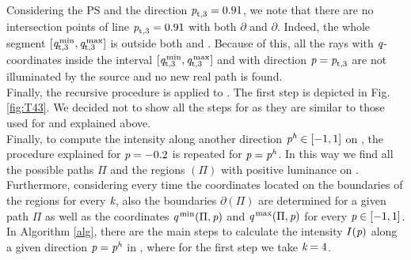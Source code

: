  Considering the PS  and the direction $\textit{p}_{\textrm{t,} \textit{$3$}}=0.91$, we note that there are no intersection points of line
 $\textit{p}_{\textrm{t,} \textit{$3$}}=0.91$ with both $\partial$ and $\partial$.
 Indeed, the whole segment $[\textit{q}_{\textrm{t,} \textit{$3$}}^\textrm{\,min},\textit{q}_{\textrm{t,} \textit{$3$}}^\textrm{\,max}]$ is outside both
  and . Because of this, all the rays with $\textit{q}$-coordinates inside the interval
 $[\textit{q}_{\textrm{t,} \textit{$3$}}^\textrm{\,min},\textit{q}_{\textrm{t,} \textit{$3$}}^\textrm{\,max}]$
and with direction $\textit{p}= \textit{p}_{\textrm{t,} \textit{$3$}}$ are not illuminated by the source and no new real path is found.
\\ \indent
Finally, the recursive procedure is applied to .
The first step is depicted in Fig. \ref{fig:T43}.
 We decided not to show all the steps for  as they are similar to those used for  and explained above.
 \\ \indent Finally, to compute the intensity along another direction $\textit{p}^{\textit{h}}\in[-1,1]$ on ,
the procedure explained for $\textit{p}=-0.2$ is repeated for $\textit{p}= \textit{p}^{\textit{h}}$.
In this way we find all the possible paths $\Pi$ and the regions $(\Pi)$ with positive luminance on .
Furthermore, considering every time the coordinates located on the boundaries of the regions  for every $\textit{k}$, also the boundaries $\partial$$(\Pi)$ are determined for a given path $\Pi$ as well as the coordinates $\textit{q}^\textrm{\,min}(\Pi,\textit{p})$ and $\textit{q}^\textrm{\,max}(\Pi,\textit{p})$ for every $\textit{p}\in [-1,1]$.
In Algorithm \ref{alg}, there are the main steps to calculate the intensity $I(\textit{p})$ along a given direction
$\textit{p} = \textit{p}^{\textit{h}}$ in , where for the first step we take $\textit{k}=4$.
